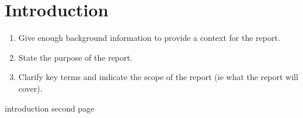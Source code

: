 \chapter{Introduction}
\begin{enumerate}
\item
Give enough background information to provide a context for the report.
\item
State the purpose of the report.
\item
Clarify key terms and indicate the scope of the report (ie what the report will cover).
\end{enumerate}

\newpage
introduction second page